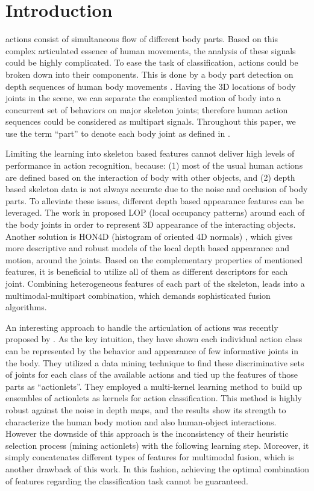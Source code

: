 \documentclass[9pt,technote,compsoc]{IEEEtran}
\begin{document}
\IEEEpeerreviewmaketitle
\vspace*{-0.7cm}
\section{Introduction}


 actions consist of simultaneous flow of different body parts. Based on this complex articulated essence of human movements, the analysis of these signals could be highly complicated. To ease the task of classification, actions could be broken down into their components. This is done by a body part detection on depth sequences of human body movements \cite{shotton2011CVPR}. Having the 3D locations of body joints in the scene, we can separate the complicated motion of body into a concurrent set of behaviors on major skeleton joints; therefore human action sequences could be considered as multipart signals. Throughout this paper, we use the term ``part'' to denote each body joint as defined in \cite{shotton2011CVPR}.

Limiting the learning into skeleton based features cannot deliver high levels of performance in action recognition, because: (1) most of the usual human actions are defined based on the interaction of body with other objects, and (2) depth based skeleton data is not always accurate due to the noise and occlusion of body parts. To alleviate these issues, different depth based appearance features can be leveraged. The work in \cite{actionletPAMI} proposed LOP (local occupancy patterns) around each of the body joints in order to represent 3D appearance of the interacting objects. Another solution is HON4D (histogram of oriented 4D normals) \cite{HON4D}, which gives more descriptive and robust models of the local depth based appearance and motion, around the joints. Based on the complementary properties of mentioned features, it is beneficial to utilize all of them as different descriptors for each joint. Combining heterogeneous features of each part of the skeleton, leads into a multimodal-multipart combination, which demands sophisticated fusion algorithms.

An interesting approach to handle the articulation of actions was recently proposed by \cite{actionletPAMI}. As the key intuition, they have shown each individual action class can be represented by the behavior and appearance of few informative joints in the body. They utilized a data mining technique to find these discriminative sets of joints for each class of the available actions and tied up the features of those parts as ``actionlets''. They employed a multi-kernel learning method to build up ensembles of actionlets as kernels for action classification. This method is highly robust against the noise in depth maps, and the results show its strength to characterize the human body motion and also human-object interactions. However the downside of this approach is the inconsistency of their heuristic selection process (mining actionlets) with the following learning step. Moreover, it simply concatenates different types of features for multimodal fusion, which is another drawback of this work. In this fashion, achieving the optimal combination of features regarding the classification task cannot be guaranteed.
\end{document}

